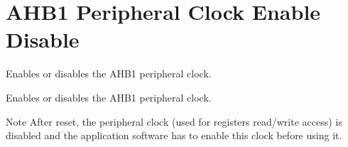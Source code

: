 \hypertarget{group___r_c_c_ex___a_h_b1___clock___enable___disable}{}\section{A\+H\+B1 Peripheral Clock Enable Disable}
\label{group___r_c_c_ex___a_h_b1___clock___enable___disable}


Enables or disables the A\+H\+B1 peripheral clock.  


Enables or disables the A\+H\+B1 peripheral clock. 

\begin{DoxyNote}{Note}
After reset, the peripheral clock (used for registers read/write access) is disabled and the application software has to enable this clock before using it. 
\end{DoxyNote}
